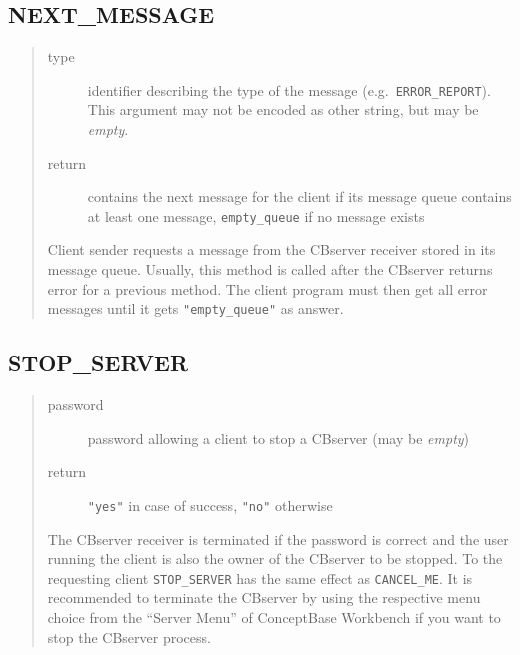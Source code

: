 \subsection{NEXT\_MESSAGE}


\begin{quote}
\begin{description}
\item[type] identifier describing the type of the message (e.g.\ \verb+ERROR_REPORT+).
This argument may not be encoded as other string, but may be {\em empty}.
\item[return] contains the next message for the client if its message
  queue contains at least one message, {\tt empty\_queue} if no message
  exists
\end{description}

Client sender requests a message from the CBserver receiver stored in
its message queue. Usually, this method is called after the CBserver returns
error for a previous method. The client program must then get all error messages
until it gets \verb+"empty_queue"+ as answer.

\end{quote}


\subsection{STOP\_SERVER}


\begin{quote}

\begin{description}
\item[password] password allowing a client to stop a CBserver (may be {\em empty})
\item[return] \verb+"yes"+ in case of success, \verb+"no"+ otherwise
\end{description}

The CBserver receiver is terminated if the
password is correct and the user running the client is also the owner
of the CBserver to be stopped. To the requesting client {\tt STOP\_SERVER}
has the same effect as {\tt CANCEL\_ME}. It is recommended to terminate the
CBserver by using the respective menu choice from the ``Server Menu'' of
ConceptBase Workbench if you want to stop the CBserver process.

\end{quote}



